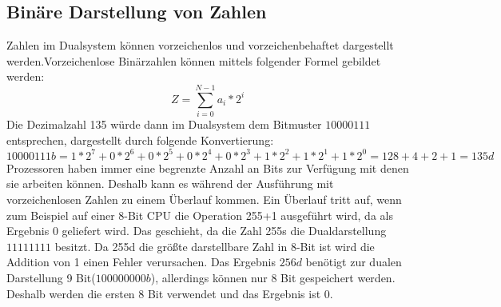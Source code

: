 \documentclass[12pt]{article}
\begin{document}
\subsection{Binäre Darstellung von Zahlen}
Zahlen im Dualsystem können vorzeichenlos und vorzeichenbehaftet dargestellt werden.Vorzeichenlose Binärzahlen können mittels folgender Formel gebildet werden: $$Z=\sum\limits_{i=0}^{N-1} a_i * 2^i$$ 
Die Dezimalzahl 135 würde dann im Dualsystem dem Bitmuster $10000111$ entsprechen, dargestellt durch folgende Konvertierung:
$$10000111b = 1*2^7+0*2^6+0*2^5+0*2^4+0*2^3+1*2^2+1*2^1+1*2^0 = 128 +4+2+1 = 135d$$
Prozessoren haben immer eine begrenzte Anzahl an Bits zur Verfügung mit denen sie arbeiten können. Deshalb kann es während der Ausführung mit vorzeichenlosen Zahlen zu einem Überlauf kommen. Ein Überlauf tritt auf, wenn zum Beispiel auf einer 8-Bit CPU die Operation 255+1 ausgeführt wird, da als Ergebnis 0 geliefert wird. 
Das geschieht, da die Zahl 255s die Dualdarstellung $11111111$ besitzt. Da 255d die größte darstellbare Zahl in 8-Bit ist wird die Addition von 1 einen Fehler verursachen. Das Ergebnis $256d$ benötigt zur dualen Darstellung 9 Bit($100000000b$), allerdings können nur 8 Bit gespeichert werden. Deshalb werden die ersten 8 Bit verwendet und das Ergebnis ist 0.
\end{document}
